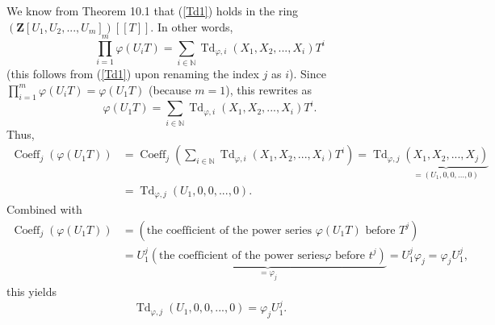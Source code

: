 \documentclass[numbers=enddot,12pt,final,onecolumn,notitlepage]{scrartcl}%
\begin{document}
We know from Theorem 10.1 that (\ref{Td1}) holds in the ring $\left(
\mathbf{Z}\left[  U_{1},U_{2},...,U_{m}\right]  \right)  \left[  \left[
T\right]  \right]  $. In other words,%
\[
\prod\limits_{i=1}^{m}\varphi\left(  U_{i}T\right)  =\sum_{i\in\mathbb{N}%
}\operatorname*{Td}\nolimits_{\varphi,i}\left(  X_{1},X_{2},...,X_{i}\right)
T^{i}%
\]
(this follows from (\ref{Td1}) upon renaming the index $j$ as $i$). Since
$\prod\limits_{i=1}^{m}\varphi\left(  U_{i}T\right)  =\varphi\left(
U_{1}T\right)  $ (because $m=1$), this rewrites as
\[
\varphi\left(  U_{1}T\right)  =\sum_{i\in\mathbb{N}}\operatorname*{Td}%
\nolimits_{\varphi,i}\left(  X_{1},X_{2},...,X_{i}\right)  T^{i}.
\]
Thus,%
\begin{align*}
\operatorname*{Coeff}\nolimits_{j}\left(  \varphi\left(  U_{1}T\right)
\right)   &  =\operatorname*{Coeff}\nolimits_{j}\left(  \sum_{i\in\mathbb{N}%
}\operatorname*{Td}\nolimits_{\varphi,i}\left(  X_{1},X_{2},...,X_{i}\right)
T^{i}\right)  =\operatorname*{Td}\nolimits_{\varphi,j}\underbrace{\left(
X_{1},X_{2},...,X_{j}\right)  }_{=\left(  U_{1},0,0,...,0\right)  }\\
&  =\operatorname*{Td}\nolimits_{\varphi,j}\left(  U_{1},0,0,...,0\right)  .
\end{align*}
Combined with%
\begin{align*}
\operatorname*{Coeff}\nolimits_{j}\left(  \varphi\left(  U_{1}T\right)
\right)   &  =\left(  \text{the coefficient of the power series }%
\varphi\left(  U_{1}T\right)  \text{ before }T^{j}\right) \\
&  =U_{1}^{j}\underbrace{\left(  \text{the coefficient of the power series
}\varphi\text{ before }t^{j}\right)  }_{=\varphi_{j}}=U_{1}^{j}\varphi
_{j}=\varphi_{j}U_{1}^{j},
\end{align*}
this yields
\[
\operatorname*{Td}\nolimits_{\varphi,j}\left(  U_{1},0,0,...,0\right)
=\varphi_{j}U_{1}^{j}.
\]
\end{document}
